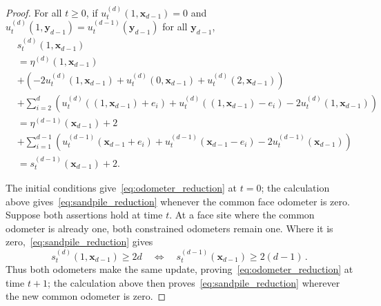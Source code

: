 \documentclass[12pt]{amsart}
\begin{document}
\begin{proof}
	For all $t \geq 0$, if  $u_{t}^{(d)}(1,\mathbf{x}_{d-1}) = 0$ and $u_t^{(d)}(1,\mathbf{y}_{d-1}) = u_t^{(d-1)}(\mathbf{y}_{d-1})$ for all $\mathbf{y}_{d-1}$, 
	\begin{align*}
	&s_{t}^{(d)}(1, \mathbf{x}_{d-1}) \\
	&=  \eta^{(d)}(1, \mathbf{x}_{d-1})  \\
	&+ \left( -2 u_{t}^{(d)}(1, \mathbf{x}_{d-1}) + u_{t}^{(d)}(0, \mathbf{x}_{d-1}) + u_{t}^{(d)}(2, \mathbf{x}_{d-1}) \right) \\
	&+ \sum_{i=2}^d \left( u_{t}^{(d)}((1,\mathbf{x}_{d-1}) + e_i) + u_{t}^{(d)}((1,\mathbf{x}_{d-1})-e_i) - 2 u_{t}^{(d)}(1,\mathbf{x}_{d-1}) \right) \\
	&= \eta^{(d-1)}(\mathbf{x}_{d-1}) + 2 \\
	&+  \sum_{i=1}^{d-1} \left( u_{t}^{(d-1)}(\mathbf{x}_{d-1} + e_i) + u_{t}^{(d-1)}(\mathbf{x}_{d-1}-e_i) - 2 u_{t}^{(d-1)}(\mathbf{x}_{d-1}) \right) \\
	&=s_{t}^{(d-1)}(\mathbf{x}_{d-1})+2.
	\end{align*}
	
The initial conditions give~\eqref{eq:odometer_reduction} at $t=0$; the calculation above gives~\eqref{eq:sandpile_reduction} whenever the common face odometer is zero. Suppose both assertions hold at time $t$. At a face site where the common odometer is already one, both constrained odometers remain one. Where it is zero,~\eqref{eq:sandpile_reduction} gives
\begin{equation*}
s_t^{(d)}(1,\mathbf x_{d-1})\geq2d
\quad\Longleftrightarrow\quad
s_t^{(d-1)}(\mathbf x_{d-1})\geq2(d-1)\,.
\end{equation*}
Thus both odometers make the same update, proving~\eqref{eq:odometer_reduction} at time $t+1$; the calculation above then proves~\eqref{eq:sandpile_reduction} wherever the new common odometer is zero.
	
\end{proof}
\end{document}
